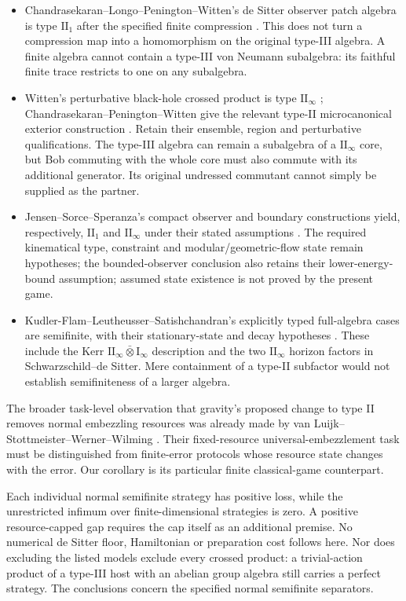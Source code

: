 \begin{itemize}
\item Chandrasekaran--Longo--Penington--Witten's de Sitter observer patch algebra is type $\mathrm{II}_1$ after the specified finite compression \cite[Sections 2.4 and 4]{CLPW}. This does not turn a compression map into a homomorphism on the original type-III algebra. A finite algebra cannot contain a type-III von Neumann subalgebra: its faithful finite trace restricts to one on any subalgebra.
\item Witten's perturbative black-hole crossed product is type $\mathrm{II}_\infty$ \cite[Section 3]{Witten}; Chandrasekaran--Penington--Witten give the relevant type-II microcanonical exterior construction \cite[Sections 2--4]{CPW}. Retain their ensemble, region and perturbative qualifications. The type-III algebra can remain a subalgebra of a $\mathrm{II}_\infty$ core, but Bob commuting with the whole core must also commute with its additional generator. Its original undressed commutant cannot simply be supplied as the partner.
\item Jensen--Sorce--Speranza's compact observer and boundary constructions yield, respectively, $\mathrm{II}_1$ and $\mathrm{II}_\infty$ under their stated assumptions \cite[Sections 2.1 and 5]{JSS}. The required kinematical type, constraint and modular/geometric-flow state remain hypotheses; the bounded-observer conclusion also retains their lower-energy-bound assumption; assumed state existence is not proved by the present game.
\item Kudler-Flam--Leutheusser--Satishchandran's explicitly typed full-algebra cases are semifinite, with their stationary-state and decay hypotheses \cite[Sections 6--8]{KFLS}. These include the Kerr $\mathrm{II}_\infty\bar\otimes\mathrm{I}_\infty$ description and the two $\mathrm{II}_\infty$ horizon factors in Schwarzschild--de Sitter. Mere containment of a type-II subfactor would not establish semifiniteness of a larger algebra.
\end{itemize}
The broader task-level observation that gravity's proposed change to type II removes normal embezzling resources was already made by van Luijk--Stottmeister--Werner--Wilming \cite[Corollary 54 and Section 2, version 4]{VLSWW}. Their fixed-resource universal-embezzlement task must be distinguished from finite-error protocols whose resource state changes with the error. Our corollary is its particular finite classical-game counterpart.

Each individual normal semifinite strategy has positive loss, while the unrestricted infimum over finite-dimensional strategies is zero. A positive resource-capped gap requires the cap itself as an additional premise. No numerical de Sitter floor, Hamiltonian or preparation cost follows here. Nor does excluding the listed models exclude every crossed product: a trivial-action product of a type-III host with an abelian group algebra still carries a perfect strategy. The conclusions concern the specified normal semifinite separators.

